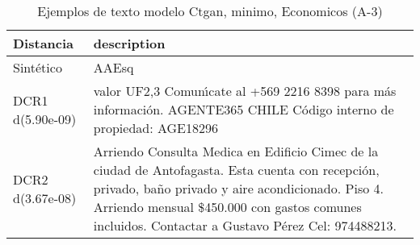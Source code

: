 \begin{table}[H]
\centering
\fontsize{10}{14}\selectfont
\caption{Ejemplos de texto modelo Ctgan, minimo, Economicos (A-3)}
\label{table-example-economicos-a-3-ctgan-min-text}
\begin{tabular}{|l|m{35em}|}
\hline
\rowcolor[gray]{0.8}
Distancia & description \\
\hline Sintético & AAEsq \\
\hline DCR1 d(5.90e-09) & valor UF2,3 Comun{\'\i}cate al +569 2216 8398 para m\'as informaci\'on. AGENTE365 CHILE C\'odigo interno de propiedad: AGE18296 \\
\hline DCR2 d(3.67e-08) & Arriendo Consulta Medica en Edificio Cimec de la ciudad de Antofagasta. Esta cuenta con recepci\'on, privado, ba\~no privado y aire acondicionado. Piso 4. Arriendo mensual \$450.000 con gastos comunes incluidos.
Contactar a Gustavo P\'erez Cel: 974488213. \\
\hline
\end{tabular}
\end{table}
